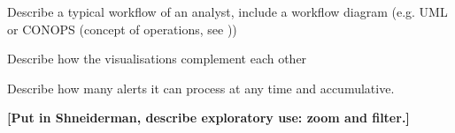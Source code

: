 Describe a typical workflow of an analyst, include a workflow diagram (e.g. UML or CONOPS (concept of operations, see ))

Describe how the visualisations complement each other

Describe how many alerts it can process at any time and accumulative.

\textbf{[Put in Shneiderman, describe exploratory use: zoom and filter.]}